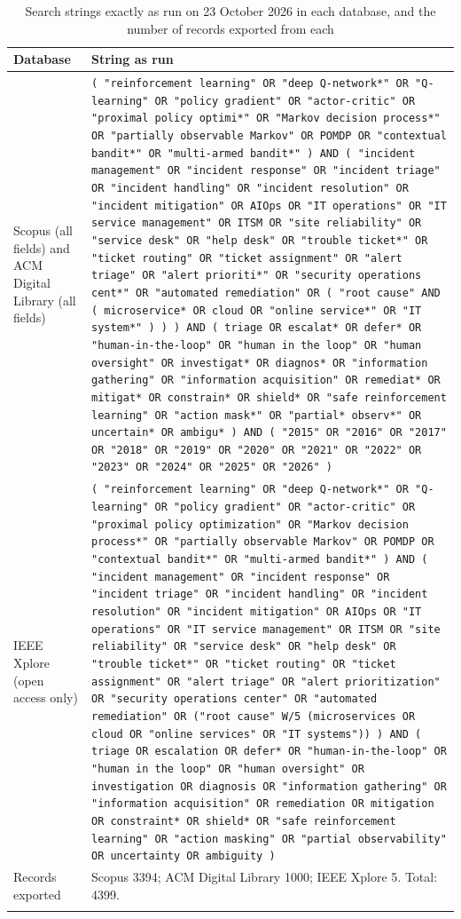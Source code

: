 \documentclass[pdflatex,sn-basic]{sn-jnl}
\begin{document}
\begin{table}[!htbp]
\caption{Search strings exactly as run on 23 October 2026 in each database, and the number of records exported from each}\label{tab:strings}
\scriptsize
\begin{tabularx}{\textwidth}{@{}P{2.2cm}L@{}}
\toprule
Database & String as run \\
\midrule
Scopus (all fields) and ACM Digital Library (all fields) & \texttt{( "reinforcement learning" OR "deep Q-network*" OR "Q-learning" OR "policy gradient" OR "actor-critic" OR "proximal policy optimi*" OR "Markov decision process*" OR "partially observable Markov" OR POMDP OR "contextual bandit*" OR "multi-armed bandit*" ) AND ( "incident management" OR "incident response" OR "incident triage" OR "incident handling" OR "incident resolution" OR "incident mitigation" OR AIOps OR "IT operations" OR "IT service management" OR ITSM OR "site reliability" OR "service desk" OR "help desk" OR "trouble ticket*" OR "ticket routing" OR "ticket assignment" OR "alert triage" OR "alert prioriti*" OR "security operations cent*" OR "automated remediation" OR ( "root cause" AND ( microservice* OR cloud OR "online service*" OR "IT system*" ) ) ) AND ( triage OR escalat* OR defer* OR "human-in-the-loop" OR "human in the loop" OR "human oversight" OR investigat* OR diagnos* OR "information gathering" OR "information acquisition" OR remediat* OR mitigat* OR constrain* OR shield* OR "safe reinforcement learning" OR "action mask*" OR "partial* observ*" OR uncertain* OR ambigu* ) AND ( "2015" OR "2016" OR "2017" OR "2018" OR "2019" OR "2020" OR "2021" OR "2022" OR "2023" OR "2024" OR "2025" OR "2026" )} \\
\addlinespace
IEEE Xplore (open access only) & \texttt{( "reinforcement learning" OR "deep Q-network*" OR "Q-learning" OR "policy gradient" OR "actor-critic" OR "proximal policy optimization" OR "Markov decision process*" OR "partially observable Markov" OR POMDP OR "contextual bandit*" OR "multi-armed bandit*" ) AND ( "incident management" OR "incident response" OR "incident triage" OR "incident handling" OR "incident resolution" OR "incident mitigation" OR AIOps OR "IT operations" OR "IT service management" OR ITSM OR "site reliability" OR "service desk" OR "help desk" OR "trouble ticket*" OR "ticket routing" OR "ticket assignment" OR "alert triage" OR "alert prioritization" OR "security operations center" OR "automated remediation" OR ("root cause" W/5 (microservices OR cloud OR "online services" OR "IT systems")) ) AND ( triage OR escalation OR defer* OR "human-in-the-loop" OR "human in the loop" OR "human oversight" OR investigation OR diagnosis OR "information gathering" OR "information acquisition" OR remediation OR mitigation OR constraint* OR shield* OR "safe reinforcement learning" OR "action masking" OR "partial observability" OR uncertainty OR ambiguity )} \\
\midrule
Records exported & Scopus 3394; ACM Digital Library 1000; IEEE Xplore 5. Total: 4399. \\
\botrule
\end{tabularx}
\end{table}
\end{document}
